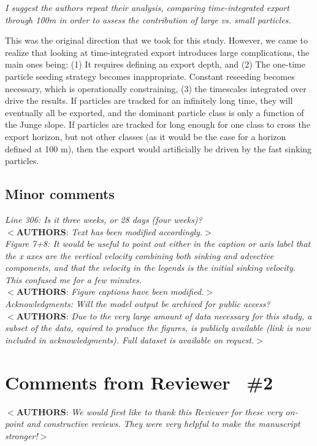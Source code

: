 \documentclass[12pt,letter]{article}
\newcommand{\rep}[1]{\color{blue}$<$\textbf{AUTHORS}: \textit{#1}$>$\color{black}\\}
\begin{document}
\textit{I suggest the authors repeat their analysis, comparing time-integrated export through 100m in order to assess the contribution of large vs. small particles.\\}

This was the original direction that we took for this study. However, we came to realize that looking at time-integrated export introduces large complications, the main ones being: (1) It requires defining an export depth, and (2) The one-time particle seeding strategy becomes inappropriate. Constant reseeding becomes necessary, which is operationally constraining, (3) the timescales integrated over drive the results. If particles are tracked for an infinitely long time, they will eventually all be exported, and the dominant particle class is only a function of the Junge slope. If particles are tracked for long enough for one class to cross the export horizon, but not other classes (as it would be the case for a horizon defined at 100 m), then the export would artificially be driven by the fast sinking particles.

\subsection*{Minor comments}
\textit{Line 306: Is it three weeks, or 28 days (four weeks)?}\\
\rep{Text has been modified accordingly.}
\textit{Figure 7+8: It would be useful to point out either in the caption or axis label that the x axes are the vertical velocity combining both sinking and advective components, and that the velocity in the legends is the initial sinking velocity. This confused me for a few minutes.}\\
\rep{Figure captions have been modified.}
\textit{Acknowledgments: Will the model output be archived for public access?}\\
\rep{Due to the very large amount of data necessary for this study, a subset of the data, equired to produce the figures, is publicly available (link is now included in acknowledgments). Full dataset is available on request.}

\section{Comments from Reviewer  \#2}
\rep{We would first like to thank this Reviewer for these very on-point and constructive reviews. They were very helpful to make the manuscript stronger!}
\end{document}
